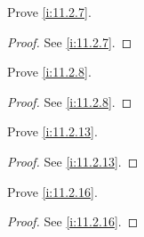 \begin{ex}\label{i:ex:11.2.1}
  Prove \cref{i:11.2.7}.
\end{ex}

\begin{proof}
  See \cref{i:11.2.7}.
\end{proof}

\begin{ex}\label{i:ex:11.2.2}
  Prove \cref{i:11.2.8}.
\end{ex}

\begin{proof}
  See \cref{i:11.2.8}.
\end{proof}

\begin{ex}\label{i:ex:11.2.3}
  Prove \cref{i:11.2.13}.
\end{ex}

\begin{proof}
  See \cref{i:11.2.13}.
\end{proof}

\begin{ex}\label{i:ex:11.2.4}
  Prove \cref{i:11.2.16}.
\end{ex}

\begin{proof}
  See \cref{i:11.2.16}.
\end{proof}
